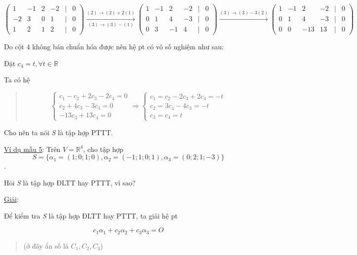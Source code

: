 \documentclass[12pt,a4paper]{article}
\begin{document}
\[ \begin{pmatrix} 1 & -1 & 2 & -2 & | & 0 \\ -2 & 3 & 0 & 1 & | & 0 \\ 1 & 2 & 1 & 2 & | & 0 \end{pmatrix} \xrightarrow[(3) \rightarrow (3) - (1)]{(2) \rightarrow (2) + 2(1)} \begin{pmatrix} 1 & -1 & 2 & -2 & | & 0 \\ 0 & 1 & 4 & -3 & | & 0 \\ 0 & 3 & -1 & 4 & | & 0 \end{pmatrix} \xrightarrow{(3) \rightarrow (3) - 3(2)} \begin{pmatrix} 1 & -1 & 2 & -2 & | & 0 \\ 0 & 1 & 4 & -3 & | & 0 \\ 0 & 0 & -13 & 13 & | & 0 \end{pmatrix} \]

Do cột 4 không bán chuẩn hóa được nên hệ pt có vô số nghiệm như sau:

Đặt $c_4 = t, \forall t \in \mathbb{R}$

Ta có hệ

\begin{quote}
\[ \begin{cases} c_1 - c_2 + 2c_3 - 2c_4 = 0 \\ c_2 + 4c_3 - 3c_4 = 0 \\ -13c_3 + 13c_4 = 0 \end{cases} \Rightarrow \begin{cases} c_1 = c_2 - 2c_3 + 2c_4 = -t \\ c_2 = 3c_4 - 4c_3 = -t \\ c_3 = c_4 = t \end{cases} \]
\end{quote}

Cho nên ta nói \emph{S} là tập hợp PTTT.

\ul{Ví dụ mẫu 5}: Trên
$V = \mathbb{R}^4$, cho tập hợp
\[ S = \{\alpha_1 = (1; 0; 1; 0), \alpha_2 = (-1; 1; 0; 1), \alpha_3 = (0; 2; 1; -3)\} \].

Hỏi \emph{S} là tập hợp ĐLTT hay PTTT, vì sao?

\ul{Giải}:

Để kiểm tra \emph{S} là tập hợp ĐLTT hay PTTT, ta giải hệ pt

\[ c_1\alpha_1 + c_2\alpha_2 + c_3\alpha_3 = O \]

\begin{quote}
(ở đây ẩn số là
$C_1, C_2, C_3$)
\end{quote}
\end{document}

